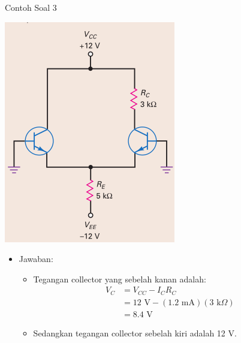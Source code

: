 \documentclass[aspectratio=169]{beamer}
\begin{document}
\begin{frame}{Contoh Soal 3}
	\begin{multicols}{2}
		\begin{center}
			\includegraphics[width=0.6\textheight]{gambar/01.diff-amp/01.latihan_soal_3}
		\end{center}
		\columnbreak
		\begin{itemize}
			\item Jawaban:
			\begin{itemize}
				\item Tegangan collector yang sebelah kanan adalah:
				\begin{align*}
					V_C &= V_{CC} - I_C R_C \\
					&= 12 \text{ V} - (1.2 \text{ mA})(3 \text{ k}\Omega) \\
					&= 8.4 \text{ V}
				\end{align*}
				\item Sedangkan tegangan collector sebelah kiri adalah 12 V.
			\end{itemize}
		\end{itemize}
		\vfill\null
	\end{multicols}
\end{frame}
\end{document}
